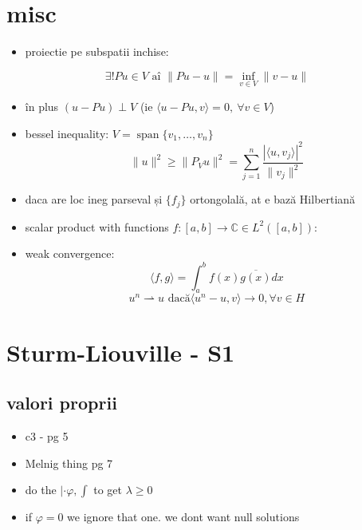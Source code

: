 \documentclass[11pt]{article}
\begin{document}
\section*{misc}
\label{sec:org838abf9}
\begin{itemize}
\item proiectie pe subspatii inchise:
\end{itemize}
\[ \exists ! Pu \in V  \text{ aî } \| P u - u \|  = \inf_{v \in V} \| v - u \| \]
\begin{itemize}
\item în plus \((u-Pu)\perp V\) (ie \(\langle u-Pu, v \rangle = 0,~ \forall v \in V\))
\end{itemize}
\begin{itemize}
\item bessel inequality: \(V = \operatorname{span} \{ v_1,\ldots, v_n \}\)
\[ \| u\|^2 \geq \|P_V u\|^2 = \sum_{j=1}^n \frac{|\langle u, v_j\rangle|^2}{\|v_j\|^2} \]
\item daca are loc ineg parseval și \(\{f_j\}\) ortongolală, at e bază Hilbertiană
\item scalar product with functions \(f: [a,b] \to \mathbb{C} \in L^2([a, b])\):
\item weak convergence:
\[ \langle f, g\rangle = \int_a^b f(x) \overline{g(x)} dx  \]
\[ u^n \rightharpoonup u \text{ dacă} \langle u^n-u, v\rangle \to 0, \forall v \in H \]
\end{itemize}

\section*{Sturm-Liouville - S1}
\label{sec:orgd3859db}
\subsection*{valori proprii}
\label{sec:org5fcfc04}
\begin{itemize}
\item c3 - pg 5
\item Melnig thing pg 7

\item do the \(|\cdot \varphi, \int\) to get \(\lambda \geq 0\)
\item if \(\varphi = 0\) we ignore that one. we dont want null solutions
\end{itemize}
\end{document}
